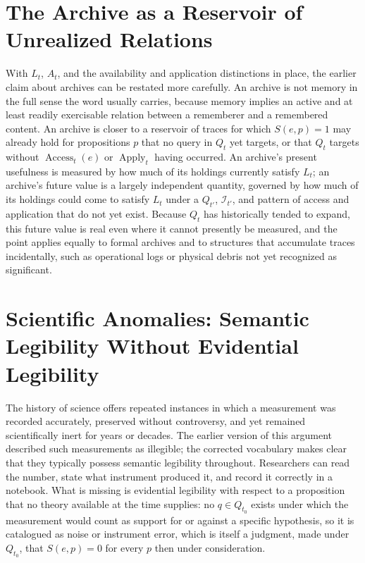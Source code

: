 \documentclass[11pt]{article}
\begin{document}
\section{The Archive as a Reservoir of Unrealized Relations}

With $L_t$, $A_t$, and the availability and application distinctions in place, the earlier claim about archives can be restated more carefully. An archive is not memory in the full sense the word usually carries, because memory implies an active and at least readily exercisable relation between a rememberer and a remembered content. An archive is closer to a reservoir of traces for which $S(e,p)=1$ may already hold for propositions $p$ that no query in $Q_t$ yet targets, or that $Q_t$ targets without $\operatorname{Access}_t(e)$ or $\operatorname{Apply}_t$ having occurred. An archive's present usefulness is measured by how much of its holdings currently satisfy $L_t$; an archive's future value is a largely independent quantity, governed by how much of its holdings could come to satisfy $L_t$ under a $Q_{t'}$, $\mathcal I_{t'}$, and pattern of access and application that do not yet exist. Because $Q_t$ has historically tended to expand, this future value is real even where it cannot presently be measured, and the point applies equally to formal archives and to structures that accumulate traces incidentally, such as operational logs or physical debris not yet recognized as significant.

\section{Scientific Anomalies: Semantic Legibility Without Evidential Legibility}

The history of science offers repeated instances in which a measurement was recorded accurately, preserved without controversy, and yet remained scientifically inert for years or decades. The earlier version of this argument described such measurements as illegible; the corrected vocabulary makes clear that they typically possess semantic legibility throughout. Researchers can read the number, state what instrument produced it, and record it correctly in a notebook. What is missing is evidential legibility with respect to a proposition that no theory available at the time supplies: no $q \in Q_{t_0}$ exists under which the measurement would count as support for or against a specific hypothesis, so it is catalogued as noise or instrument error, which is itself a judgment, made under $Q_{t_0}$, that $S(e,p)=0$ for every $p$ then under consideration.
\end{document}
